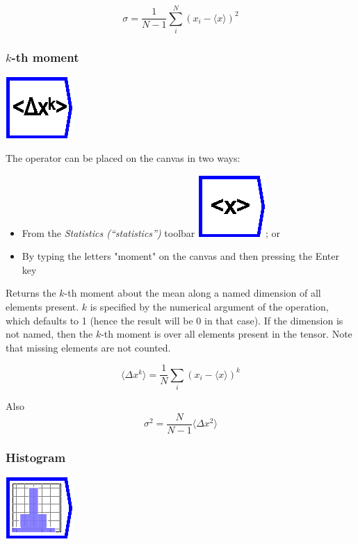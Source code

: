 \[
\sigma=\frac{1}{N-1}\sum_{i}^{N}(x_{i}-\langle x\rangle)^{2}
\]


\subsubsection{$k$-th moment}

\label{Operation:moment}

\includegraphics{images/moment}

The operator can be placed on the canvas in two ways:
\begin{itemize}
\item From the \emph{Statistics (``statistics'')} toolbar \includegraphics{images/mean};
or 
\item By typing the letters "moment" on the canvas and then pressing the
Enter key
\end{itemize}
Returns the $k$-th moment about the mean along a named dimension
of all elements present. $k$ is specified by the numerical argument
of the operation, which defaults to 1 (hence the result will be 0
in that case). If the dimension is not named, then the $k$-th moment
is over all elements present in the tensor. Note that missing elements
are not counted.

\[
\langle\Delta x^{k}\rangle=\frac{1}{N}\sum_{i}(x_{i}-\langle x\rangle)^{k}
\]

Also 
\[
\sigma^{2}=\frac{N}{N-1}\langle\Delta x^{2}\rangle
\]


\subsubsection{Histogram}

\label{Operation:histogram}

\includegraphics{images/histogram}

